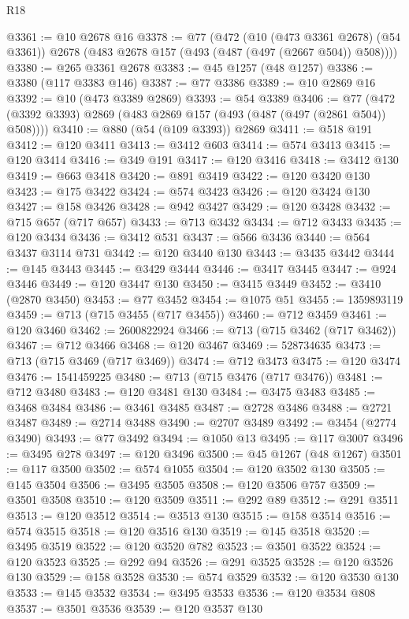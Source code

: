 \begin{lexlean}{R18}
\begin{coremodule}
@3361 := @10 @2678 @16
@3378 := @77
    (@472
      (@10 (@473 @3361 @2678) (@54 @3361))
      @2678
      (@483 @2678 @157 (@493 (@487 (@497 (@2667 @504)) @508))))
@3380 := @265 @3361 @2678
@3383 := @45 @1257 (@48 @1257)
@3386 := @3380 (@117 @3383 @146)
@3387 := @77 @3386
@3389 := @10 @2869 @16
@3392 := @10 (@473 @3389 @2869)
@3393 := @54 @3389
@3406 := @77 (@472 (@3392 @3393) @2869 (@483 @2869 @157 (@493 (@487 (@497 (@2861 @504)) @508))))
@3410 := @880 (@54 (@109 @3393)) @2869
@3411 := @518 @191
@3412 := @120 @3411
@3413 := @3412 @603
@3414 := @574 @3413
@3415 := @120 @3414
@3416 := @349 @191
@3417 := @120 @3416
@3418 := @3412 @130
@3419 := @663 @3418
@3420 := @891 @3419
@3422 := @120 @3420 @130
@3423 := @175 @3422
@3424 := @574 @3423
@3426 := @120 @3424 @130
@3427 := @158 @3426
@3428 := @942 @3427
@3429 := @120 @3428
@3432 := @715 @657 (@717 @657)
@3433 := @713 @3432
@3434 := @712 @3433
@3435 := @120 @3434
@3436 := @3412 @531
@3437 := @566 @3436
@3440 := @564 @3437 @3114 @731
@3442 := @120 @3440 @130
@3443 := @3435 @3442
@3444 := @145 @3443
@3445 := @3429 @3444
@3446 := @3417 @3445
@3447 := @924 @3446
@3449 := @120 @3447 @130
@3450 := @3415 @3449
@3452 := @3410 (@2870 @3450)
@3453 := @77 @3452
@3454 := @1075 @51
@3455 := 1359893119
@3459 := @713 (@715 @3455 (@717 @3455))
@3460 := @712 @3459
@3461 := @120 @3460
@3462 := 2600822924
@3466 := @713 (@715 @3462 (@717 @3462))
@3467 := @712 @3466
@3468 := @120 @3467
@3469 := 528734635
@3473 := @713 (@715 @3469 (@717 @3469))
@3474 := @712 @3473
@3475 := @120 @3474
@3476 := 1541459225
@3480 := @713 (@715 @3476 (@717 @3476))
@3481 := @712 @3480
@3483 := @120 @3481 @130
@3484 := @3475 @3483
@3485 := @3468 @3484
@3486 := @3461 @3485
@3487 := @2728 @3486
@3488 := @2721 @3487
@3489 := @2714 @3488
@3490 := @2707 @3489
@3492 := @3454 (@2774 @3490)
@3493 := @77 @3492
@3494 := @1050 @13
@3495 := @117 @3007
@3496 := @3495 @278
@3497 := @120 @3496
@3500 := @45 @1267 (@48 @1267)
@3501 := @117 @3500
@3502 := @574 @1055
@3504 := @120 @3502 @130
@3505 := @145 @3504
@3506 := @3495 @3505
@3508 := @120 @3506 @757
@3509 := @3501 @3508
@3510 := @120 @3509
@3511 := @292 @89
@3512 := @291 @3511
@3513 := @120 @3512
@3514 := @3513 @130
@3515 := @158 @3514
@3516 := @574 @3515
@3518 := @120 @3516 @130
@3519 := @145 @3518
@3520 := @3495 @3519
@3522 := @120 @3520 @782
@3523 := @3501 @3522
@3524 := @120 @3523
@3525 := @292 @94
@3526 := @291 @3525
@3528 := @120 @3526 @130
@3529 := @158 @3528
@3530 := @574 @3529
@3532 := @120 @3530 @130
@3533 := @145 @3532
@3534 := @3495 @3533
@3536 := @120 @3534 @808
@3537 := @3501 @3536
@3539 := @120 @3537 @130

\end{coremodule}
\end{lexlean}

